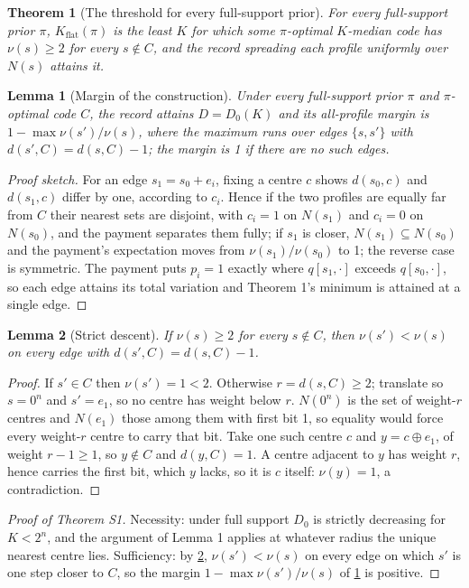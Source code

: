 \documentclass[sigconf,anonymous,acmthm=false]{aamas}
\theoremstyle{acmplain}
\newtheorem{slemma}{Lemma}
\newtheorem{stheorem}{Theorem}
\theoremstyle{acmdefinition}
\newcommand{\Kflat}{K_{\mathrm{flat}}}
\begin{document}
\begin{stheorem}[The threshold for every full-support prior]\label{thm:prior}
For every full-support prior $\pi$, $\Kflat(\pi)$ is the least $K$ for which some
$\pi$-optimal $K$-median code has $\nu(s)\ge2$ for every $s\notin C$, and the record spreading
each profile uniformly over $N(s)$ attains it.
\end{stheorem}

\begin{slemma}[Margin of the construction]\label{lem:gen-margin}
Under every full-support prior $\pi$ and $\pi$-optimal code $C$, the record attains
$D=D_0(K)$ and its all-profile margin is $1-\max\nu(s')/\nu(s)$, where the maximum runs over
edges $\{s,s'\}$ with $d(s',C)=d(s,C)-1$; the margin is 1 if there are no such edges.
\end{slemma}
\begin{proof}[Proof sketch]
For an edge $s_1=s_0+e_i$, fixing a centre $c$ shows $d(s_0,c)$ and $d(s_1,c)$ differ by
one, according to $c_i$. Hence if the two profiles are equally far from $C$ their nearest
sets are disjoint, with $c_i=1$ on $N(s_1)$ and $c_i=0$ on $N(s_0)$, and the payment
separates them fully; if $s_1$ is closer, $N(s_1)\subseteq N(s_0)$ and the payment's
expectation moves from $\nu(s_1)/\nu(s_0)$ to 1; the reverse case is symmetric. The payment
puts $p_i=1$ exactly where $q[s_1,\cdot]$ exceeds $q[s_0,\cdot]$, so each edge attains its
total variation and Theorem 1's minimum is attained at a single edge.
\end{proof}

\begin{slemma}[Strict descent]\label{lem:strict-descent}
If $\nu(s)\ge2$ for every $s\notin C$, then $\nu(s')<\nu(s)$ on every edge with
$d(s',C)=d(s,C)-1$.
\end{slemma}
\begin{proof}
If $s'\in C$ then $\nu(s')=1<2$. Otherwise $r=d(s,C)\ge2$; translate so $s=0^n$ and
$s'=e_1$, so no centre has weight below $r$. $N(0^n)$ is the set of weight-$r$ centres and
$N(e_1)$ those among them with first bit 1, so equality would force every weight-$r$ centre
to carry that bit. Take one such centre $c$ and $y=c\oplus e_1$, of weight $r-1\ge1$, so
$y\notin C$ and $d(y,C)=1$. A centre adjacent to $y$ has weight $r$, hence carries the first
bit, which $y$ lacks, so it is $c$ itself: $\nu(y)=1$, a contradiction.
\end{proof}

\begin{proof}[Proof of Theorem S1]
Necessity: under full support $D_0$ is strictly decreasing for $K<2^n$, and the argument of
Lemma 1 applies at whatever radius the unique nearest centre lies. Sufficiency: by
\cref{lem:strict-descent}, $\nu(s')<\nu(s)$ on every edge on which $s'$ is one step closer to
$C$, so the margin $1-\max\nu(s')/\nu(s)$ of \cref{lem:gen-margin} is positive.
\end{proof}
\end{document}

